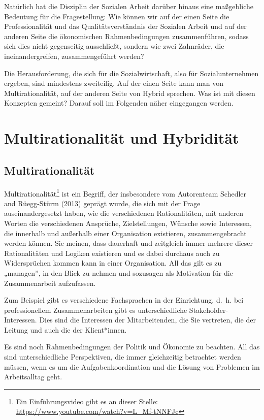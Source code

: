 \documentclass[
  letterpaper,
]{book}
\begin{document}
Natürlich hat die Disziplin der Sozialen Arbeit darüber hinaus eine
maßgebliche Bedeutung für die Fragestellung: Wie können wir auf der
einen Seite die Professionalität und das Qualitätsverständnis der
Sozialen Arbeit und auf der anderen Seite die ökonomischen
Rahmenbedingungen zusammenführen, sodass sich dies nicht gegenseitig
ausschließt, sondern wie zwei Zahnräder, die ineinandergreifen,
zusammengeführt werden?

Die Herausforderung, die sich für die Sozialwirtschaft, also für
Sozialunternehmen ergeben, sind mindestens zweiteilig. Auf der einen
Seite kann man von Multirationalität, auf der anderen Seite von Hybrid
sprechen. Was ist mit diesen Konzepten gemeint? Darauf soll im Folgenden
näher eingegangen werden.

\section{Multirationalität und
Hybridität}\label{multirationalitt-und-hybriditaet}

\subsection{Multirationalität}\label{sozialwirtschat-multirationalitaet}

Multirationalität\footnote{Ein Einführungsvideo gibt es an dieser
  Stelle: \url{https://www.youtube.com/watch?v=L_Mf-tNNFJc}} ist ein
Begriff, der insbesondere vom Autorenteam Schedler and Rüegg-Stürm
(2013) geprägt wurde, die sich mit der Frage auseinandergesetzt haben,
wie die verschiedenen Rationalitäten, mit anderen Worten die
verschiedenen Ansprüche, Zielstellungen, Wünsche sowie Interessen, die
innerhalb und außerhalb einer Organisation existieren, zusammengebracht
werden können. Sie meinen, dass dauerhaft und zeitgleich immer mehrere
dieser Rationalitäten und Logiken existieren und es dabei durchaus auch
zu Widersprüchen kommen kann in einer Organisation. All das gilt es zu
„managen'', in den Blick zu nehmen und sozusagen als Motivation für die
Zusammenarbeit aufzufassen.

Zum Beispiel gibt es verschiedene Fachsprachen in der Einrichtung, d.~h.
bei professionellem Zusammenarbeiten gibt es unterschiedliche
Stakeholder-Interessen. Dies sind die Interessen der Mitarbeitenden, die
Sie vertreten, die der Leitung und auch die der Klient*innen.

Es sind noch Rahmenbedingungen der Politik und Ökonomie zu beachten. All
das sind unterschiedliche Perspektiven, die immer gleichzeitig
betrachtet werden müssen, wenn es um die Aufgabenkoordination und die
Lösung von Problemen im Arbeitsalltag geht.
\end{document}
